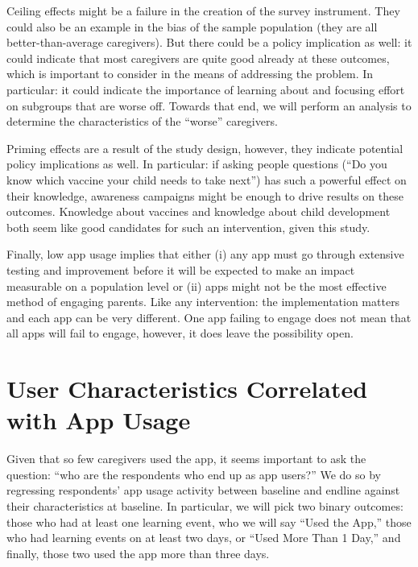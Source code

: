 \documentclass{article}
\begin{document}
Ceiling effects might be a failure in the creation of the survey instrument. They could also be an example in the bias of the sample population (they are all better-than-average caregivers). But there could be a policy implication as well: it could indicate that most caregivers are quite good already at these outcomes, which is important to consider in the means of addressing the problem. In particular: it could indicate the importance of learning about and focusing effort on subgroups that are worse off. Towards that end, we will perform an analysis to determine the characteristics of the ``worse'' caregivers.

Priming effects are a result of the study design, however, they indicate potential policy implications as well. In particular: if asking people questions (``Do you know which vaccine your child needs to take next'') has such a powerful effect on their knowledge, awareness campaigns might be enough to drive results on these outcomes. Knowledge about vaccines and knowledge about child development both seem like good candidates for such an intervention, given this study.

Finally, low app usage implies that either (i) any app must go through extensive testing and improvement before it will be expected to make an impact measurable on a population level or (ii) apps might not be the most effective method of engaging parents. Like any intervention: the implementation matters and each app can be very different. One app failing to engage does not mean that all apps will fail to engage, however, it does leave the possibility open.



\section{User Characteristics Correlated with App Usage}


Given that so few caregivers used the app, it seems important to ask the question: ``who are the respondents who end up as app users?'' We do so by regressing respondents' app usage activity between baseline and endline against their characteristics at baseline. In particular, we will pick two binary outcomes: those who had at least one learning event, who we will say ``Used the App,'' those who had learning events on at least two days, or ``Used More Than 1 Day,'' and finally, those two used the app more than three days.
\end{document}
